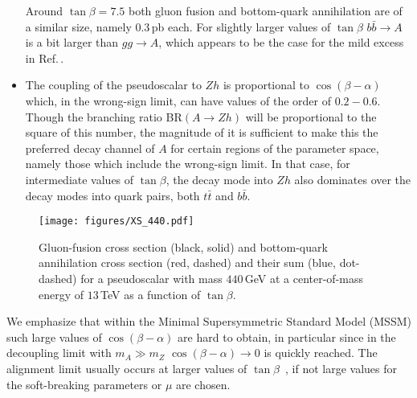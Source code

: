 \documentclass[12pt]{article}
\newcommand{\citere}[1]{Ref.\,\cite{#1}}
\newcommand{\abbrev}{\scalefont{.9}}
\newcommand{\mssm}{{\abbrev MSSM}}
\begin{document}
\begin{itemize}
Around $\tan\beta=7.5$ both gluon fusion and bottom-quark annihilation are of a similar size, namely $0.3$\,pb each.
For slightly larger values of $\tan\beta$ $b\bar b\to A$ is a bit larger than $gg\to A$, which appears to be the case for the mild excess in \citere{ATLAS:2017nxi}.
%
\item The coupling of the pseudoscalar to $Zh$ is proportional to $\cos(\beta-\alpha)$
which, in the wrong-sign limit, can have values of the order of $0.2-0.6$. Though the
branching ratio BR$(A\to Zh)$ will be proportional to the square of this number, the
magnitude of it is sufficient to make this the preferred decay channel of $A$ for
certain regions of the parameter space, namely those which include the wrong-sign limit.
In that case, for intermediate values of $\tan\beta$, the decay mode into $Zh$ also dominates
over the decay modes into quark pairs, both $t\bar t$ and $b\bar b$.
%
\end{itemize}
\begin{figure}
\begin{center}
\texttt{[image: figures/XS\_440.pdf]}
\end{center}
\vspace{-5mm}
\caption{Gluon-fusion cross section (black, solid) and bottom-quark annihilation cross section (red, dashed)
and their sum (blue, dot-dashed) for a pseudoscalar with mass $440$\,GeV at a center-of-mass energy of $13$\,TeV
as a function of $\tan\beta$.
}
\label{fig:ggAbbA}
\end{figure}

We emphasize that within the Minimal Supersymmetric Standard Model (\mssm{}) such large values of $\cos(\beta-\alpha)$ are
hard to obtain, in particular since in the decoupling limit with $m_A\gg m_Z$
$\cos(\beta-\alpha)\to 0$ is quickly reached. The alignment limit
usually occurs at larger values of $\tan\beta$~\cite{Carena:2013ooa},
if not large values for the soft-breaking parameters or $\mu$ are chosen.
\end{document}
